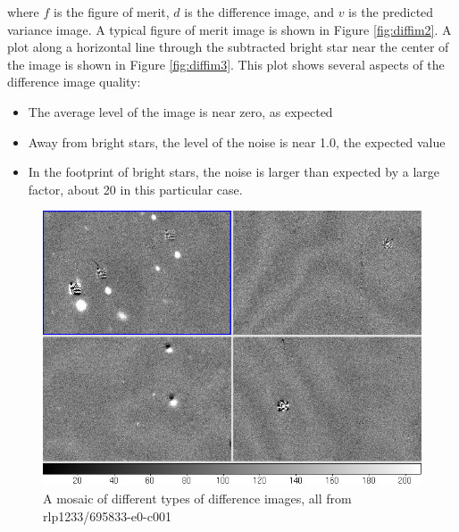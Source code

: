 where $f$ is the figure of merit, $d$ is the difference image, and $v$
is the predicted variance image.  A typical figure of merit image is
shown in Figure \ref{fig:diffim2}.  A plot along a horizontal line through
the subtracted bright star near the center of the image is shown in
Figure \ref{fig:diffim3}.  This plot shows several aspects of the difference
image quality:

\begin{itemize}
\item The average level of the image is near zero, as expected
\item Away from bright stars, the level of the noise is near 1.0, the
  expected value
\item In the footprint of bright stars, the noise is larger than
  expected by a large factor, about 20 in this particular case.
\end{itemize}  

\begin{figure}[hb]
\begin{center}
\includegraphics{images/rlp1233_v695833-e0-c001-mosaic.png}
\caption{A mosaic of different types of difference images, all from rlp1233/695833-e0-c001}  
\label{fig:diffim1}
\end{center}
\end{figure}

